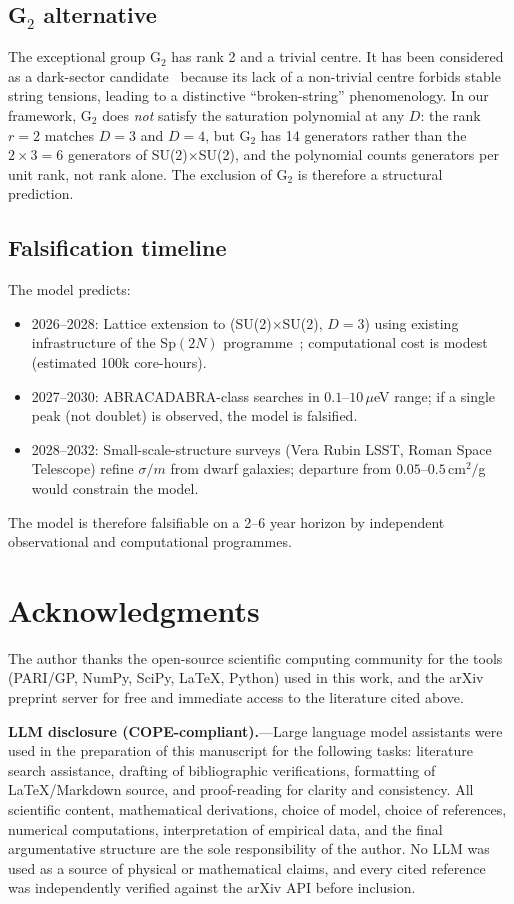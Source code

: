 \documentclass[aps,prd,twocolumn,nofootinbib,superscriptaddress,floatfix]{revtex4-2}
\begin{document}
\subsection{G$_2$ alternative}
The exceptional group G$_2$ has rank 2 and a trivial centre. It has been considered as a dark-sector candidate~\cite{MaasWellegehausen2014} because its lack of a non-trivial centre forbids stable string tensions, leading to a distinctive ``broken-string'' phenomenology. In our framework, G$_2$ does \emph{not} satisfy the saturation polynomial at any $D$: the rank $r=2$ matches $D=3$ and $D=4$, but G$_2$ has 14 generators rather than the $2\times 3=6$ generators of SU(2)$\times$SU(2), and the polynomial counts generators per unit rank, not rank alone. The exclusion of G$_2$ is therefore a structural prediction.

\subsection{Falsification timeline}
The model predicts:
\begin{itemize}
    \item 2026--2028: Lattice extension to (SU(2)$\times$SU(2), $D=3$) using existing infrastructure of the Sp$(2N)$ programme~\cite{Bennett2020}; computational cost is modest (estimated 100k core-hours).
    \item 2027--2030: ABRACADABRA-class searches in $0.1$--$10\,\mu$eV range; if a single peak (not doublet) is observed, the model is falsified.
    \item 2028--2032: Small-scale-structure surveys (Vera Rubin LSST, Roman Space Telescope) refine $\sigma/m$ from dwarf galaxies; departure from $0.05$--$0.5\,$cm$^2/$g would constrain the model.
\end{itemize}
The model is therefore falsifiable on a 2--6 year horizon by independent observational and computational programmes.

\section*{Acknowledgments}
\label{sec:ack}
The author thanks the open-source scientific computing community for the tools (PARI/GP, NumPy, SciPy, LaTeX, Python) used in this work, and the arXiv preprint server for free and immediate access to the literature cited above.

\textbf{LLM disclosure (COPE-compliant).}---Large language model assistants were used in the preparation of this manuscript for the following tasks: literature search assistance, drafting of bibliographic verifications, formatting of \LaTeX/Markdown source, and proof-reading for clarity and consistency. All scientific content, mathematical derivations, choice of model, choice of references, numerical computations, interpretation of empirical data, and the final argumentative structure are the sole responsibility of the author. No LLM was used as a source of physical or mathematical claims, and every cited reference was independently verified against the arXiv API before inclusion.
\end{document}
